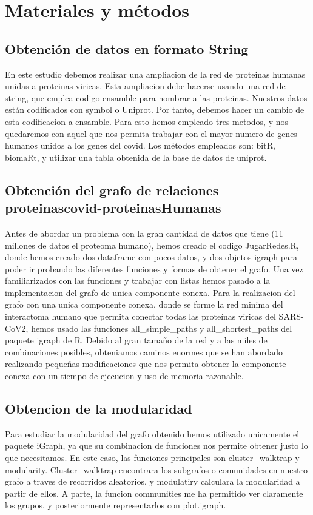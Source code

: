 \section{Materiales y métodos}


\subsection{Obtención de datos en formato String}
En este estudio debemos realizar una ampliacion de la red de proteinas humanas unidas a proteinas viricas.
Esta ampliacion debe hacerse usando una red de string, que emplea codigo ensamble para nombrar a las proteinas.
Nuestros datos están codificados con symbol o Uniprot. Por tanto, debemos hacer un cambio de esta codificacion a ensamble.
Para esto hemos empleado tres metodos, y nos quedaremos con aquel que nos permita trabajar con el mayor numero de genes humanos unidos a los genes del covid.
Los métodos empleados son: bitR, biomaRt, y utilizar una tabla obtenida de la base de datos de uniprot. 

\subsection{Obtención del grafo de relaciones proteinascovid-proteinasHumanas}
Antes de abordar un problema con la gran cantidad de datos que tiene (11 millones de datos el proteoma humano), hemos creado el codigo JugarRedes.R, donde hemos creado dos dataframe con pocos datos, y dos objetos igraph para poder ir probando las diferentes funciones y formas de obtener el grafo. Una vez familiarizados con las funciones y trabajar con listas hemos pasado a la implementacion del grafo de unica componente conexa.
Para la realizacion del grafo con una unica componente conexa, donde se forme la red minima del interactoma humano
que permita conectar todas las proteínas viricas del SARS-CoV2, hemos usado las funciones all\_simple\_paths y all\_shortest\_paths 
del paquete igraph de R. Debido al gran tamaño de la red y a las miles de combinaciones posibles, obteniamos caminos enormes que
se han abordado realizando pequeñas modificaciones que nos permita obtener la componente conexa con un tiempo de ejecucion y 
uso de memoria razonable. 

\subsection{Obtencion de la modularidad}
Para estudiar la modularidad del grafo obtenido hemos utilizado unicamente el paquete iGraph, ya que su combinacion de funciones nos permite obtener justo lo que necesitamos.
En este caso, las funciones principales son cluster\_walktrap y modularity. Cluster\_walktrap encontrara los subgrafos o comunidades en nuestro grafo a traves de recorridos aleatorios, y modulatiry calculara la modularidad a partir de ellos. 
A parte, la funcion communities me ha permitido ver claramente los grupos, y posteriormente representarlos con plot.igraph.

